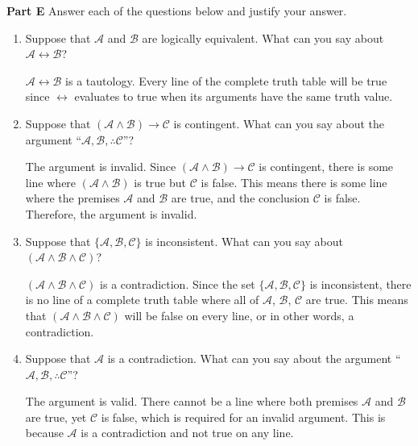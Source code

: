 \documentclass[12pt, letterpaper, twoside]{article}
\begin{document}
\noindent \textbf{Part E} Answer each of the questions below
and justify your answer.
\begin{enumerate}
	\item Suppose that $\mathcal{A}$ and $\mathcal{B}$
          are logically equivalent. What can you say about
          $\mathcal{A}\leftrightarrow\mathcal{B}$?

	$\mathcal{A}\leftrightarrow\mathcal{B}$ is a
          tautology.  Every line of the complete truth table
          will be true since $\leftrightarrow$ evaluates to
          true when its arguments have the same truth value.

	\item Suppose that
          $(\mathcal{A}\wedge\mathcal{B})\rightarrow\mathcal{C}$
          is contingent. What can you say about the argument
          ``$\mathcal{A}, \mathcal{B},
          \therefore\mathcal{C}$''?

	The argument is invalid. Since
        $(\mathcal{A}\wedge\mathcal{B})\rightarrow\mathcal{C}$
        is contingent, there is some line where
        $(\mathcal{A}\wedge\mathcal{B})$ is true but
        $\mathcal{C}$ is false. This means there is some
        line where the premises $\mathcal{A}$ and
        $\mathcal{B}$ are true, and the conclusion
        $\mathcal{C}$ is false. Therefore, the argument is
        invalid.

	\item Suppose that $\{\mathcal{A},\mathcal{B},
          \mathcal{C}\}$ is inconsistent. What can you say
          about
          $(\mathcal{A}\wedge\mathcal{B}\wedge\mathcal{C})$?

	$(\mathcal{A}\wedge\mathcal{B}\wedge\mathcal{C})$ is
          a contradiction. Since the set
          $\{\mathcal{A},\mathcal{B}, \mathcal{C}\}$ is
          inconsistent, there is no line of a complete truth
          table where all of $\mathcal{A}$, $\mathcal{B}$,
          $\mathcal{C}$ are true. This means that
          $(\mathcal{A}\wedge\mathcal{B}\wedge\mathcal{C})$
          will be false on every line, or in other words, a
          contradiction.

	\item Suppose that $\mathcal{A}$ is a
          contradiction. What can you say about the argument
          ``$\mathcal{A}, \mathcal{B},
          \therefore\mathcal{C}$''?

	The argument is valid. There cannot be a line where
        both premises $\mathcal{A}$ and $\mathcal{B}$ are
        true, yet $\mathcal{C}$ is false, which is required
        for an invalid argument. This is because
        $\mathcal{A}$ is a contradiction and not true on any
        line.


\end{enumerate}
\end{document}
